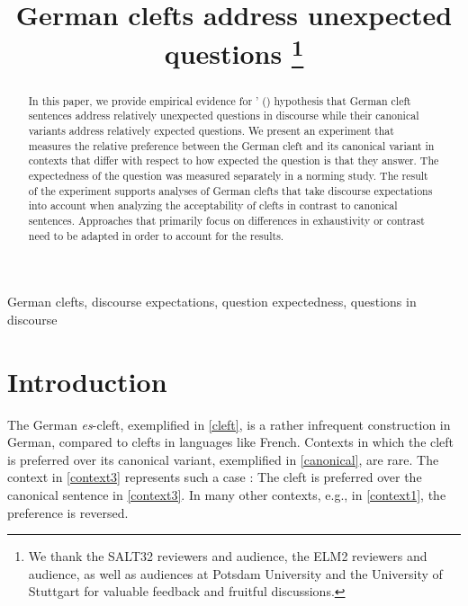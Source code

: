 \documentclass{salt}
\title[German clefts address unexpected questions]{German clefts address unexpected questions%
  \thanks{We thank the SALT32 reviewers and audience, the ELM2 reviewers and audience, as well as audiences at Potsdam University and the University of Stuttgart for valuable feedback and fruitful discussions.}
}
\author[Swantje T\"onnis, Judith Tonhauser]{%
  \saltauthor{Swantje T\"onnis \\ \institute{University of Stuttgart}} \AND
  \saltauthor{Judith Tonhauser \\ \institute{University of Stuttgart}} %
}
\begin{document}

\maketitle

%
\setcounter{page}{1}


\begin{abstract}  
In this paper, we provide empirical evidence for \citeauthor{tonnis_2021}' (\citeyear{tonnis_2021}) hypothesis that German cleft sentences address relatively unexpected questions in discourse while their canonical variants address relatively expected questions. We present an experiment that measures the relative preference between the German cleft and its canonical variant in contexts that differ with respect to how expected the question is that they answer. The expectedness of the question was measured separately in a norming study. The result of the experiment supports analyses of German clefts that take discourse expectations into account when analyzing the acceptability of clefts in contrast to canonical sentences. Approaches that primarily focus on differences in exhaustivity \cite[e.g.,][]{deveaugh-geiss_et_al_2018b} or contrast \cite[e.g.,][]{rochemont_1986} need to be adapted in order to account for the results.
\end{abstract}

\begin{keywords}
  German clefts, discourse expectations, question expectedness, questions in discourse
\end{keywords}



\section{Introduction}
\label{sec:intro}
The German \textit{es}-cleft, exemplified in \ref{cleft}, is a rather infrequent construction in German, compared to clefts in languages like French. Contexts in which the cleft is preferred over its canonical variant, exemplified in \ref{canonical}, are rare. The context in \ref{context3} represents such a case \cite[inspired by][]{tonnis_2021}: The cleft is preferred over the canonical sentence in \ref{context3}. In many other contexts, e.g., in \ref{context1}, the preference is reversed.
\end{document}
